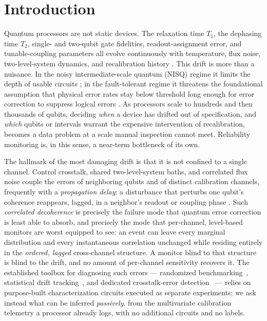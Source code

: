 \documentclass[
  aps,
  prresearch,
  reprint,
  amsmath,
  amssymb,
  nofootinbib,
  floatfix,
]{revtex4-2}
\newcommand{\T}{\ensuremath{T_1}}
\newcommand{\Ttwo}{\ensuremath{T_2}}
\begin{document}
\maketitle

\section{Introduction}

Quantum processors are not static devices. The relaxation time \T, the dephasing
time \Ttwo, single- and two-qubit gate fidelities, readout-assignment error, and
tunable-coupling parameters all evolve continuously with temperature, flux noise,
two-level-system dynamics, and recalibration history
\citep{krantz2019guide,kjaergaard2020superconducting}. This drift is more than a
nuisance. In the noisy intermediate-scale quantum (NISQ) regime it limits the
depth of usable circuits \citep{preskill2018nisq}; in the fault-tolerant regime it
threatens the foundational assumption that physical error rates stay below
threshold long enough for error correction to suppress logical errors
\citep{google2023surfacecode,arute2019supremacy}. As processors scale to hundreds
and then thousands of qubits, deciding \emph{when} a device has drifted out of
specification, and \emph{which} qubits or intervals warrant the expensive
intervention of recalibration, becomes a data problem at a scale manual inspection
cannot meet. Reliability monitoring is, in this sense, a near-term bottleneck of
its own.

The hallmark of the most damaging drift is that it is not confined to a single
channel. Control crosstalk, shared two-level-system baths, and correlated flux
noise couple the errors of neighboring qubits and of distinct calibration
channels, frequently with a \emph{propagation delay}: a disturbance that perturbs
one qubit's coherence reappears, lagged, in a neighbor's readout or coupling phase
\citep{krantz2019guide}. Such \emph{correlated decoherence} is precisely the
failure mode that quantum error correction is least able to absorb, and precisely
the mode that per-channel, level-based monitors are worst equipped to see: an event
can leave every marginal distribution and every instantaneous correlation unchanged
while residing entirely in the \emph{ordered, lagged} cross-channel structure. A
monitor blind to that structure is blind to the drift, and no amount of per-channel
sensitivity recovers it. The established toolbox for diagnosing such errors ---
randomized benchmarking~\citep{magesan2011rb}, statistical drift
tracking~\citep{proctor2020drift}, and dedicated crosstalk-error
detection~\citep{sarovar2020crosstalk} --- relies on purpose-built characterization
circuits executed as separate experiments; we ask instead what can be inferred
\emph{passively}, from the multivariate calibration telemetry a processor already
logs, with no additional circuits and no labels.
\end{document}
